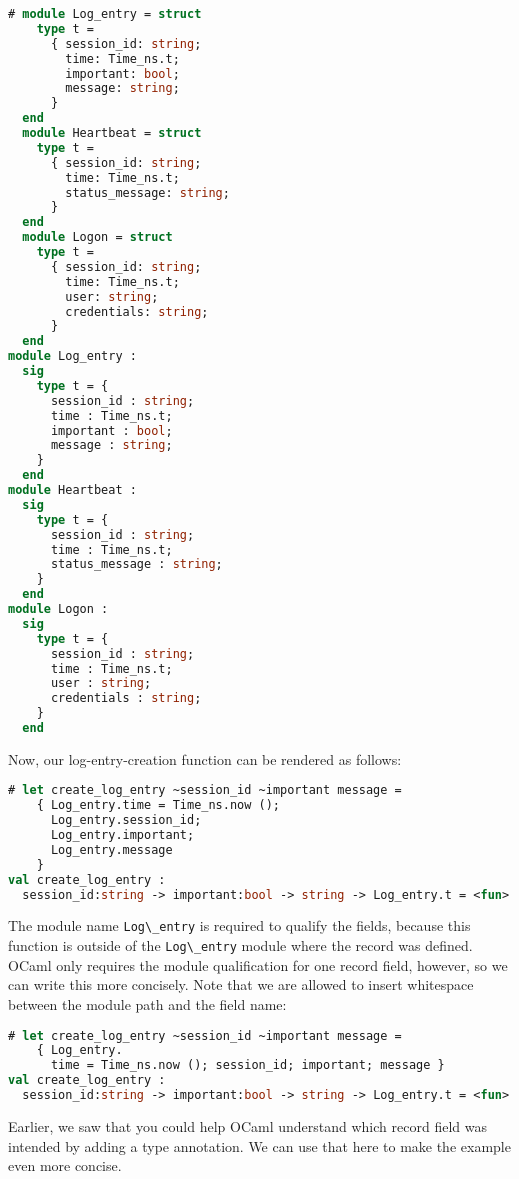 \begin{lstlisting}[language=Caml]
# module Log_entry = struct
    type t =
      { session_id: string;
        time: Time_ns.t;
        important: bool;
        message: string;
      }
  end
  module Heartbeat = struct
    type t =
      { session_id: string;
        time: Time_ns.t;
        status_message: string;
      }
  end
  module Logon = struct
    type t =
      { session_id: string;
        time: Time_ns.t;
        user: string;
        credentials: string;
      }
  end
module Log_entry :
  sig
    type t = {
      session_id : string;
      time : Time_ns.t;
      important : bool;
      message : string;
    }
  end
module Heartbeat :
  sig
    type t = {
      session_id : string;
      time : Time_ns.t;
      status_message : string;
    }
  end
module Logon :
  sig
    type t = {
      session_id : string;
      time : Time_ns.t;
      user : string;
      credentials : string;
    }
  end
\end{lstlisting}

Now, our log-entry-creation function can be rendered as follows:

\begin{lstlisting}[language=Caml]
# let create_log_entry ~session_id ~important message =
    { Log_entry.time = Time_ns.now ();
      Log_entry.session_id;
      Log_entry.important;
      Log_entry.message
    }
val create_log_entry :
  session_id:string -> important:bool -> string -> Log_entry.t = <fun>
\end{lstlisting}

The module name \passthrough{\lstinline!Log\_entry!} is required to
qualify the fields, because this function is outside of the
\passthrough{\lstinline!Log\_entry!} module where the record was
defined. OCaml only requires the module qualification for one record
field, however, so we can write this more concisely. Note that we are
allowed to insert whitespace between the module path and the field name:

\begin{lstlisting}[language=Caml]
# let create_log_entry ~session_id ~important message =
    { Log_entry.
      time = Time_ns.now (); session_id; important; message }
val create_log_entry :
  session_id:string -> important:bool -> string -> Log_entry.t = <fun>
\end{lstlisting}

Earlier, we saw that you could help OCaml understand which record field
was intended by adding a type annotation. We can use that here to make
the example even more concise.

